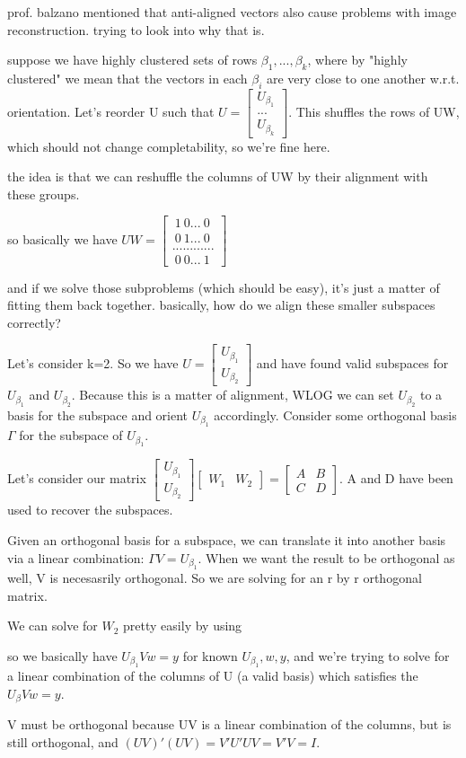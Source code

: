 \documentclass[12pt]{article}
\begin{document}
prof. balzano mentioned that anti-aligned vectors also cause problems with image reconstruction. trying to look into why that is.

suppose we have highly clustered sets of rows $\beta_1,...,\beta_k$, where by "highly clustered" we mean that the vectors in each $\beta_i$ are very close to one another w.r.t. orientation. Let's reorder U such that $U = \begin{bmatrix} U_{\beta_1}\\...\\U_{\beta_k}\end{bmatrix}$. This shuffles the rows of UW, which should not change completability, so we're fine here.

the idea is that we can reshuffle the columns of UW by their alignment with these groups.

so basically we have $UW = \begin{bmatrix} ~1 ~0 ... ~0\\~0 ~1 ... ~0 \\ ... ... ... ... \\ ~0 ~0 ... ~1\end{bmatrix}$

and if we solve those subproblems (which should be easy), it's just a matter of fitting them back together. basically, how do we align these smaller subspaces correctly?

Let's consider k=2. So we have $U = \begin{bmatrix} U_{\beta_1} \\U_{\beta_2}\end{bmatrix}$ and have found valid subspaces for $U_{\beta_1}$ and $U_{\beta_2}$. Because this is a matter of alignment, WLOG we can set $U_{\beta_2}$ to a basis for the subspace and orient $U_{\beta_1}$ accordingly. Consider some orthogonal basis $\Gamma$ for the subspace of $U_{\beta_1}$. 

Let's consider our matrix $\begin{bmatrix} U_{\beta_1} \\U_{\beta_2}\end{bmatrix}\begin{bmatrix}W_1 & W_2\end{bmatrix} = \begin{bmatrix}A & B \\C & D\end{bmatrix}$. A and D have been used to recover the subspaces. 

Given an orthogonal basis for a subspace, we can translate it into another basis via a linear combination: $\Gamma V = U_{\beta_1}$. When we want the result to be orthogonal as well, V is necesasrily orthogonal. So we are solving for an r by r orthogonal matrix. 


We can solve for $W_2$ pretty easily by using 


so we basically have $U_{\beta_1}Vw = y$ for known $U_{\beta_1},w,y$, and we're trying to solve for a linear combination of the columns of U (a valid basis) which satisfies the $U_{\beta}Vw = y$. 

V must be orthogonal because UV is a linear combination of the columns, but is still orthogonal, and $(UV)'(UV) = V'U'UV = V'V = I$.
\end{document}
